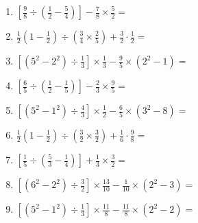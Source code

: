 \documentclass[12pt]{article}
\begin{document}
\begin{enumerate}[ itemsep=1.5cm]
	\item $\displaystyle \left[ \frac{9}{8} \div \left( \frac{1}{2} - \frac{5}{4} \right) \right] - \frac{7}{8} \times \frac{5}{2} =$
	\item $\displaystyle \frac{1}{2} \left( 1 - \frac{1}{2} \right) \div \left( \frac{3}{4} \times \frac{2}{5} \right) + \frac{3}{2} \cdot \frac{1}{2} =$
	\item $\displaystyle \left[ \left( 5^2 - 2^2 \right) \div \frac{1}{3} \right] \times \frac{1}{3} - \frac{9}{5} \times \left( 2^2 - 1 \right) =$
	\item $\displaystyle \left[ \frac{6}{5} \div \left( \frac{1}{2} - \frac{1}{5} \right) \right] - \frac{2}{3} \times \frac{9}{5} =$
	\item $\displaystyle \left[ \left( 5^2 - 1^2 \right) \div \frac{4}{3} \right] \times \frac{1}{2} - \frac{6}{5} \times \left( 3^2 - 8 \right) =$
	\item $\displaystyle \frac{1}{2} \left( 1 - \frac{1}{2} \right) \div \left( \frac{3}{2} \times \frac{3}{2} \right) + \frac{1}{6} \cdot \frac{9}{8} =$
	\item $\displaystyle \left[ \frac{1}{5} \div \left( \frac{5}{3} - \frac{1}{4} \right) \right] + \frac{1}{3} \times \frac{3}{2} =$
	\item $\displaystyle \left[ \left( 6^2 - 2^2 \right) \div \frac{3}{2} \right] \times \frac{13}{10} - \frac{1}{10} \times \left( 2^2 - 3 \right) =$
	\item $\displaystyle \left[ \left( 5^2 - 1^2 \right) \div \frac{1}{3} \right] \times \frac{11}{8} - \frac{11}{8} \times \left( 2^2 - 2 \right) =$


\end{enumerate}
\end{document}
